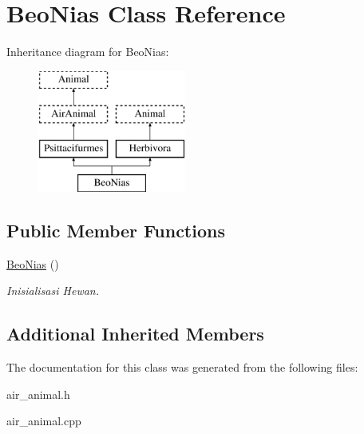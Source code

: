 \hypertarget{class_beo_nias}{}\section{Beo\+Nias Class Reference}
\label{class_beo_nias}
Inheritance diagram for Beo\+Nias\+:\begin{figure}[H]
\begin{center}
\leavevmode
\includegraphics[height=4.000000cm]{class_beo_nias}
\end{center}
\end{figure}
\subsection*{Public Member Functions}
\begin{DoxyCompactItemize}
\item 
\hyperlink{class_beo_nias_a194bc47e9a3b814159d7ac4a43293b1c}{Beo\+Nias} ()\hypertarget{class_beo_nias_a194bc47e9a3b814159d7ac4a43293b1c}{}\label{class_beo_nias_a194bc47e9a3b814159d7ac4a43293b1c}

\begin{DoxyCompactList}\small\item\em Inisialisasi Hewan. \end{DoxyCompactList}\end{DoxyCompactItemize}
\subsection*{Additional Inherited Members}


The documentation for this class was generated from the following files\+:\begin{DoxyCompactItemize}
\item 
air\+\_\+animal.\+h\item 
air\+\_\+animal.\+cpp\end{DoxyCompactItemize}
